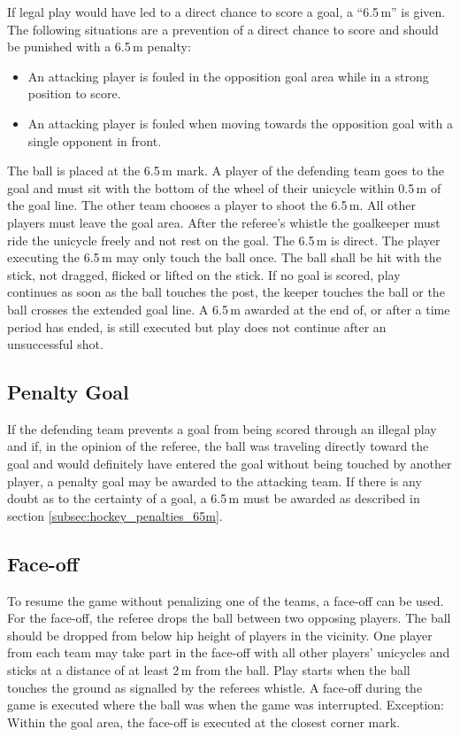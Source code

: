 If legal play would have led to a direct chance to score a goal, a ``6.5\,m'' is given.
The following situations are a prevention of a direct chance to score and should be punished with a 6.5\,m penalty:
\begin{itemize}
\item An attacking player is fouled in the opposition goal area while in a strong position to score.
\item An attacking player is fouled when moving towards the opposition goal with a single opponent in front.
\end{itemize}
The ball is placed at the 6.5\,m mark.
A player of the defending team goes to the goal and must sit with the bottom of the wheel of their unicycle within 0.5\,m of the goal line.
The other team chooses a player to shoot the 6.5\,m.
All other players must leave the goal area.
After the referee's whistle the goalkeeper must ride the unicycle freely and not rest on the goal.
The 6.5\,m is direct.
The player executing the 6.5\,m may only touch the ball once.
The ball shall be hit with the stick, not dragged, flicked or lifted on the stick.
If no goal is scored, play continues as soon as the ball touches the post, the keeper touches the ball or the ball crosses the extended goal line.
A 6.5\,m awarded at the end of, or after a time period has ended, is still executed but play does not continue after an unsuccessful shot.

\subsection{Penalty Goal}
If the defending team prevents a goal from being scored through an illegal play and if, in the opinion of the referee, the ball was traveling directly toward the goal and would definitely have entered the goal without being touched by another player, a penalty goal may be awarded to the attacking team.
If there is any doubt as to the certainty of a goal, a 6.5\,m must be awarded as described in section \ref{subsec:hockey_penalties_65m}.

\subsection{Face-off \label{subsec:hockey_penalties_face-off}}
To resume the game without penalizing one of the teams, a face-off can be used.
For the face-off, the referee drops the ball between two opposing players.
The ball should be dropped from below hip height of players in the vicinity.
One player from each team may take part in the face-off with all other players' unicycles and sticks at a distance of at least 2\,m from the ball.
Play starts when the ball touches the ground as signalled by the referees whistle.
A face-off during the game is executed where the ball was when the game was interrupted.
Exception: Within the goal area, the face-off is executed at the closest corner mark.

